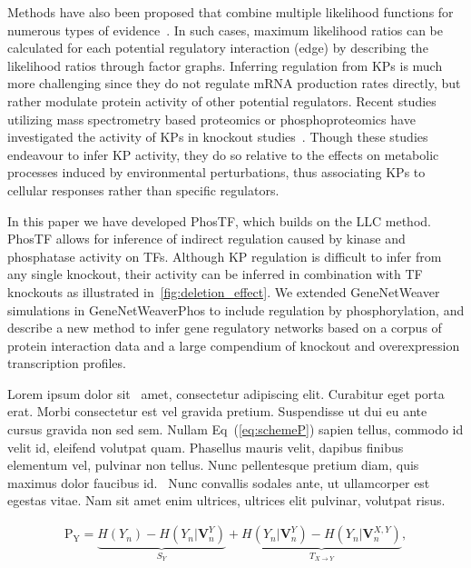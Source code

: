 \documentclass[10pt,letterpaper]{article}
\newcommand{\extendedGNW}{GeneNetWeaverPhos}
\newcommand{\PKTFX}{PhosTF}
\begin{document}
Methods have also been proposed that combine multiple likelihood functions for numerous types of evidence~. In such cases, maximum likelihood ratios can be calculated for each potential regulatory interaction (edge) by describing the likelihood ratios through factor graphs.
Inferring regulation from KPs is much more challenging since they do not regulate mRNA production rates directly, but rather modulate protein activity of other potential regulators. Recent studies utilizing mass spectrometry based proteomics or phosphoproteomics have investigated the activity of KPs in knockout studies~\citep{Goncalves2017,zelezniak2018}. Though these studies endeavour to infer KP activity, they do so relative to the effects on metabolic processes induced by environmental perturbations, thus associating KPs to cellular responses rather than specific regulators.

In this paper we {\color{red} have developed \PKTFX{}, which builds on the LLC method. \PKTFX{} allows for inference of} indirect regulation caused by kinase and phosphatase activity on TFs.
Although KP regulation is difficult to infer from any single knockout, their activity can be inferred in combination with TF knockouts as illustrated in~\autoref{fig:deletion_effect}. We extended GeneNetWeaver simulations in \extendedGNW{} to include regulation by phosphorylation, and describe a new method to infer gene regulatory networks based on a corpus of protein interaction data and a large compendium of knockout and overexpression transcription profiles. 









Lorem ipsum dolor sit~\cite{bib1} amet, consectetur adipiscing elit. Curabitur eget porta erat. Morbi consectetur est vel gravida pretium. Suspendisse ut dui eu ante cursus gravida non sed sem. Nullam Eq~(\ref{eq:schemeP}) sapien tellus, commodo id velit id, eleifend volutpat quam. Phasellus mauris velit, dapibus finibus elementum vel, pulvinar non tellus. Nunc pellentesque pretium diam, quis maximus dolor faucibus id.~\cite{bib2} Nunc convallis sodales ante, ut ullamcorper est egestas vitae. Nam sit amet enim ultrices, ultrices elit pulvinar, volutpat risus.

\begin{eqnarray}
\label{eq:schemeP}
	\mathrm{P_Y} = \underbrace{H(Y_n) - H(Y_n|\mathbf{V}^{Y}_{n})}_{S_Y} + \underbrace{H(Y_n|\mathbf{V}^{Y}_{n})- H(Y_n|\mathbf{V}^{X,Y}_{n})}_{T_{X\rightarrow Y}},
\end{eqnarray}
\end{document}

